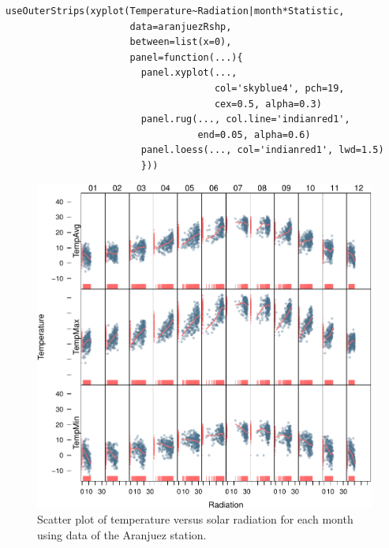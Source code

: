 \lstset{language=R}
\begin{lstlisting}
useOuterStrips(xyplot(Temperature~Radiation|month*Statistic,
                      data=aranjuezRshp,
                      between=list(x=0), 
                      panel=function(...){
                        panel.xyplot(...,
                                     col='skyblue4', pch=19,
                                     cex=0.5, alpha=0.3)
                        panel.rug(..., col.line='indianred1',
                                  end=0.05, alpha=0.6)
                        panel.loess(..., col='indianred1', lwd=1.5)
                        }))
\end{lstlisting}

\begin{figure}[htb]
\centering
\includegraphics[width=.9\linewidth]{figs/aranjuezOuterStrips.pdf}
\caption{\label{fig:aranjuezOuterStrips}Scatter plot of temperature versus solar radiation for each month using data of the Aranjuez station.}
\end{figure}
